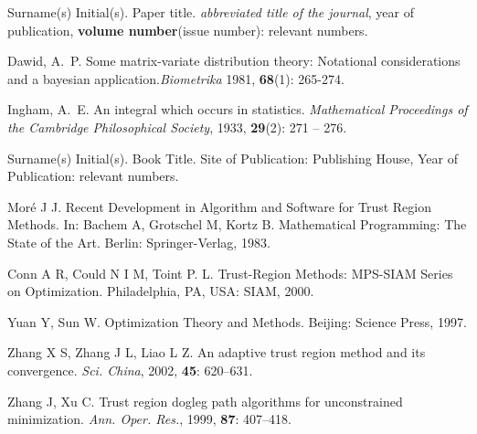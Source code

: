 \documentclass[twoside]{article}%
\begin{document}
\begin{thebibliography}{stringX}
\leftskip=-8mm
\parskip=-1mm
\small

 Surname(s) Initial(s). {P}aper title. {\it abbreviated title of the journal},
year of publication, {\bf volume number}(issue number): relevant numbers. %

 Dawid, A.~P. Some matrix-variate distribution theory: Notational
  considerations and a bayesian application.{\it Biometrika} 1981, {\bf 68}(1): 265-274.

 Ingham, A.~E. An integral which occurs in statistics. {\it Mathematical
  Proceedings of the Cambridge Philosophical Society}, 1933, {\bf 29}(2): 271 -- 276.   %

 Surname(s) Initial(s). {B}ook {T}itle. Site of Publication: Publishing House,
Year of Publication: relevant numbers. %


 Mor\'{e} J J. Recent Development in Algorithm and Software for
Trust Region Methods. In: Bachem A, Grotschel M, Kortz B. Mathematical Programming: The State of the Art.
Berlin: Springer-Verlag, 1983.

Conn A R, Could N I M, Toint P. L. Trust-Region Methods:
MPS-SIAM Series on Optimization. Philadelphia, PA, USA: SIAM, 2000.

 Yuan Y, Sun W. Optimization Theory and Methods. Beijing: Science Press, 1997.

 Zhang X S, Zhang J L, Liao L Z. An adaptive trust region
method and its convergence. {\it Sci. China}, 2002, {\bf 45}: 620--631.

 Zhang J, Xu C. Trust region dogleg path algorithms for
unconstrained minimization. {\it Ann. Oper. Res.}, 1999, {\bf 87}: 407--418.

\end{thebibliography}

\end{document}
